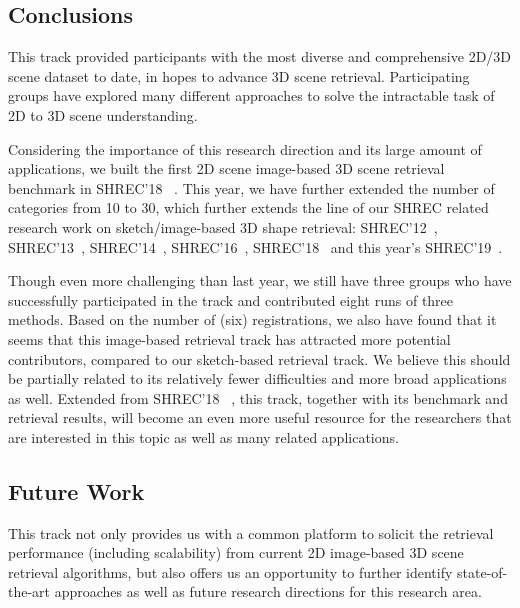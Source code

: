 \documentclass[../main.tex]{subfiles}
\begin{document}
\subsection{Conclusions}
This track provided participants with the most diverse and comprehensive 2D/3D scene dataset to date, in hopes to advance 3D scene retrieval. Participating groups have explored many different approaches to solve the intractable task of 2D to 3D scene understanding.

Considering the importance of this research direction and its large amount of 
applications, we built the first 2D scene image-based 3D scene retrieval 
benchmark in SHREC'18~\cite{SceneIBR18Journal, SceneIBR18Website} . This year, we have further 
extended the number of categories from 10 to 30, which further extends the line 
of our SHREC related research work on sketch/image-based 3D shape retrieval: 
SHREC'12~\cite{DBLP:conf/3dor/LiSGABBCEFHHJKORSSYYY12, 
DBLP:journals/cviu/0013LGSBFFFJMOPS14}, 
SHREC'13~\cite{DBLP:conf/3dor/LiLGSAJST13, 
DBLP:journals/cviu/0013LGSBFFFJMOPS14}, 
SHREC'14~\cite{DBLP:conf/3dor/LiLLGSABFFJLOTZ14, 
DBLP:journals/cviu/LiLLGSABCCFFFLLJKKOTWZZ15}, 
SHREC'16~\cite{DBLP:conf/3dor/0013LDDFQLLLLOT16}, 
SHREC'18~\cite{SceneIBR18Website} and this year's 
SHREC'19~\cite{SceneIBR19}.

Though even more challenging than last year, we still have three groups who 
have successfully participated in the track and contributed eight runs of three 
methods. Based on the number of (six) registrations, we also have found that it 
seems that this image-based retrieval track has attracted more potential 
contributors, compared to our sketch-based retrieval track. We believe this 
should be partially related to its relatively fewer difficulties and more broad 
applications as well. Extended from SHREC'18~\cite{SceneIBR18Website} \cite{SceneIBR18Journal}, 
this track, together with its benchmark and retrieval results, will become an 
even more useful resource for the researchers that are interested in this topic 
as well as many related applications.


\subsection{Future Work}
This track not only provides us with a common platform to solicit the retrieval performance (including scalability) from current 2D image-based 3D scene retrieval algorithms, but also offers us an opportunity to further identify state-of-the-art approaches as well as future research directions for this research area.
\end{document}
